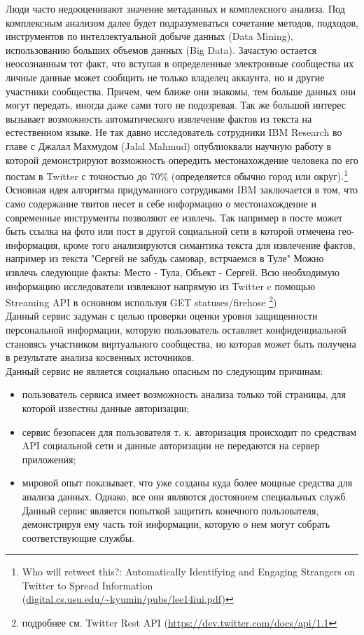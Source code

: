 Люди часто недооценивают значение метаданных и комплексного анализа. 
Под комплексным анализом далее будет подразумеваться сочетание методов, подходов, инструментов по интеллектуальной добыче данных (Data Mining), %
использованию больших объемов данных (Big Data).
Зачастую остается неосознанным тот факт, что вступая в определенные электронные сообщества их личные данные может сообщить не только владелец аккаунта, но и другие участники сообщества. Причем, чем ближе они знакомы, тем больше данных они могут передать, иногда даже сами того не подозревая. Так же большой интерес вызывает возможность автоматического извлечение фактов из текста на естественном языке. Не так давно исследователь сотрудники IBM Research во главе с Джалал Махмудом (Jalal Mahmud) опублиоквали научную работу в которой демонстрируют возможность опередить местонахождение человека по его постам в Twitter с точностью до 70\% (определяется обычно город или округ).\footnote{Who will retweet this?: Automatically Identifying and Engaging Strangers on Twitter to Spread Information (\url{digital.cs.usu.edu/~kyumin/pubs/lee14iui.pdf‎})}
 Основная идея алгоритма придуманного сотрудиками IBM заключается в том, что само содержание твитов несет в себе информацию о местонахождение и современные  инструменты  позволяют ее извлечь. Так например в посте может быть ссылка на фото или пост в другой социальной сети в которой отмечена гео-информация, кроме того анализируются симантика текста для извлечение фактов, например из текста "Сергей не забудь самовар, встрчаемся в Туле" Можно извлечь следующие факты: Место - Тула, Объект - Сергей. Всю необходимую информацию исследователи извлекают напрямую из Twitter c помощью Streaming API в основном используя GET statuses/firehose \footnote{подробнее см. Twitter Rest API (\url{https://dev.twitter.com/docs/api/1.1}})\\



Данный сервис задуман с целью проверки оценки уровня защищенности персональной информации, которую пользователь оставляет конфиденциальной становясь участником виртуального сообщества, но которая может быть получена в результате анализа косвенных источников.%
\\

Данный сервис не является социально опасным по следующим причинам:
\begin{itemize}
\item пользователь сервиса имеет возможность анализа только той страницы, для которой известны данные авторизации;
\item сервис безопасен для пользователя т. к. авторизация происходит по средствам  API  социальной сети и данные авторизации не передаются на сервер приложения; 
\item мировой опыт показывает, что уже созданы куда более мощные средства для анализа данных. Однако, все они являются достоянием специальных служб. Данный сервис является попыткой защитить конечного пользователя, демонстрируя ему часть той информации, которую о нем могут собрать соответствующие службы.
\end{itemize}

